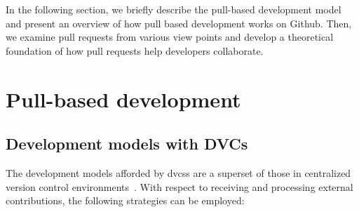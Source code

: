 \documentclass{sig-alternate}
\begin{document}
In the following section, we briefly describe the pull-based development model
and present an overview of how pull based development works on Github.
Then, we examine pull requests from various view points and develop
a theoretical foundation of how pull requests help developers collaborate. 



\section{Pull-based development}

\subsection{Development models with DVCs}

The development models afforded by {\sc dvcs}s are a superset of 
those in centralized version control environments~\cite{Shiha12,Bird09}. 
With respect to receiving and processing external contributions,
the following strategies can be employed:
\end{document}
